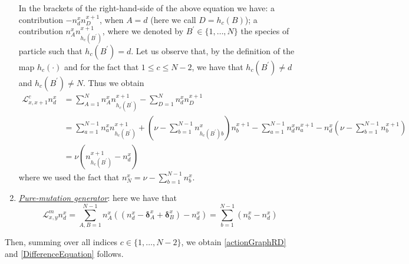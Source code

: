 \documentclass[10pt]{article}
\numberwithin{equation}{section}
\numberwithin{equation}{subsection}
\begin{document}
\begin{enumerate}
\begin{equation}
\end{equation}
In the brackets of the right-hand-side of the above equation we have: a contribution $-n_{d}^{x}n_{D}^{x+1}$, when $A=d$ (here we call $D=h_{c}(B)$); a contribution $n_{A}^{x}n_{h_{c}(B^{'})}^{x+1}$, where we denoted by $B^{'}\in \{1,\ldots,N\}$ the species of particle such that $h_{c}(B^{'})=d$. Let us observe that, by the definition of the map $h_{c}(\cdot)$ and for the fact that $1\leq c\leq N-2$, we have that $h_{c}(B^{'})\neq d$ and $h_{c}(B^{'})\neq N$. Thus we obtain 
\begin{align}
		\mathcal{L}_{x,x+1}^{c}n_{d}^{x}&=\sum_{A=1}^{N}n_{A}^{x}n_{h_{c}(B^{'})}^{x+1}-\sum_{D=1}^{N}n_{d}^{x}n_{D}^{x+1}
		\\&=
		\sum_{a=1}^{N-1}n_{a}^{x}n_{h_{c}(B^{'})}^{x+1}+\left(\nu-\sum_{b=1}^{N-1}n_{h_{c}(B^{'})b}^{x}\right)n_{b}^{x+1}-\sum_{a=1}^{N-1}n_{d}^{x}n_{a}^{x+1}-n_{d}^{x}\left(\nu-\sum_{b=1}^{N-1}n_{b}^{x+1}\right)
		\\&=
		\nu(n_{h_{c}(B^{'})}^{x+1}-n_{d}^{x})
\end{align}
where  we used the fact that $n_{N}^{x}=\nu-\sum_{b=1}^{N-1}n_{b}^{x}$. 
\item \textit{\underline{Pure-mutation generator}}: here we have that 
\begin{equation}
	\mathcal{L}_{x,y}^{m}n_{d}^{x}=\sum_{A,B=1}^{N-1}n_{A}^{x}\left((n_{d}^{x}-\bm{\delta}_{A}^{x}+\bm{\delta}_{B}^{x})-n_{d}^{x}\right)=\sum_{b=1}^{N-1}(n_{b}^{x}-n_{d}^{x})
\end{equation}
\end{enumerate}
Then, summing over all indices $c\in\{1,\ldots,N-2\}$, we obtain \eqref{actionGraphRD} and \eqref{DifferenceEquation} follows.
\end{document}
